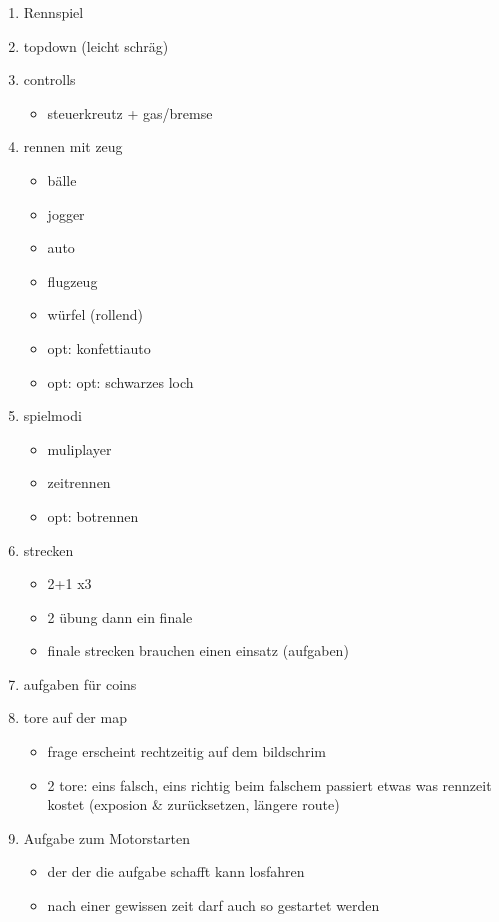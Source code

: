 \begin{enumerate}
	\item{Rennspiel}
	\item{topdown (leicht schräg)}
	\item{controlls}
	\begin{itemize}
		\item{steuerkreutz + gas/bremse}
	\end{itemize}
	\item{rennen mit zeug}
	\begin{itemize}
		\item{bälle}
		\item{jogger}
		\item{auto}
		\item{flugzeug}
		\item{würfel (rollend)}
		\item{opt: konfettiauto}
		\item{opt: opt: schwarzes loch}
	\end{itemize}
	\item{spielmodi}
	\begin{itemize}
		\item{muliplayer}
		\item{zeitrennen}
		\item{opt: botrennen}
	\end{itemize}
	\item{strecken}
	\begin{itemize}
		\item{2+1 x3}
		\item{2 übung dann ein finale}
		\item{finale strecken brauchen einen einsatz (aufgaben)}
	\end{itemize}
	\item{aufgaben für coins}
	\item{tore auf der map}
	\begin{itemize}
		\item{frage erscheint rechtzeitig auf dem bildschrim}
		\item{2 tore: eins falsch, eins richtig}
			beim falschem passiert etwas was rennzeit kostet (exposion \& zurücksetzen, längere route)
	\end{itemize}
	\item{Aufgabe zum Motorstarten}
		\begin{itemize}
			\item{der der die aufgabe schafft kann losfahren}
			\item{nach einer gewissen zeit darf auch so gestartet werden}

\end{itemize}
\end{enumerate}
